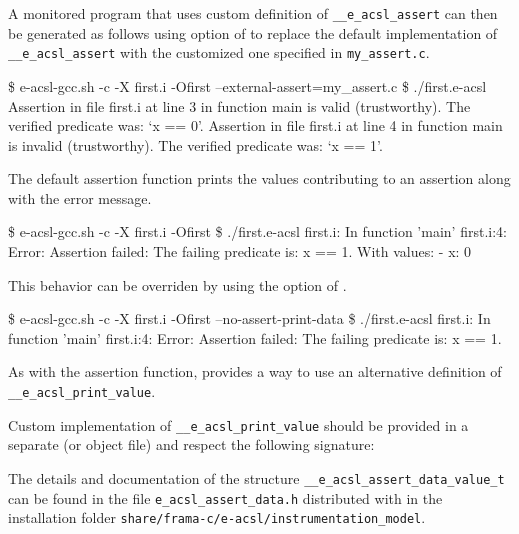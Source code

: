 
A monitored program that uses custom definition of
\texttt{\_\_e\_acsl\_assert} can then be generated
as follows using  option of \eacslgcc to replace the
default implementation of \texttt{\_\_e\_acsl\_assert}
with the customized one specified in \texttt{my\_assert.c}.

\begin{shell}
\$ e-acsl-gcc.sh -c -X first.i -Ofirst --external-assert=my_assert.c
\$ ./first.e-acsl
Assertion in file first.i at line 3 in function main is valid (trustworthy).
The verified predicate was: `x == 0'.
Assertion in file first.i at line 4 in function main is invalid (trustworthy).
The verified predicate was: `x == 1'.
\end{shell}

The default assertion function prints the values contributing to an assertion
along with the error message.

\begin{shell}
\$ e-acsl-gcc.sh -c -X first.i -Ofirst
\$ ./first.e-acsl
first.i: In function 'main'
first.i:4: Error: Assertion failed:
        The failing predicate is:
        x == 1.
        With values:
        - x: 0
\end{shell}

This behavior can be overriden by using the 
option of \eacslgcc.

\begin{shell}
  \$ e-acsl-gcc.sh -c -X first.i -Ofirst --no-assert-print-data
  \$ ./first.e-acsl
  first.i: In function 'main'
  first.i:4: Error: Assertion failed:
          The failing predicate is:
          x == 1.
\end{shell}

As with the assertion function, \eacslgcc provides a way to use an alternative
definition of
\texttt{\_\_e\_acsl\_print\_value}.

Custom implementation of \texttt{\_\_e\_acsl\_print\_value}
 should be provided in a separate \C
(or object file) and respect the following signature:


The details and documentation of the structure
\texttt{\_\_e\_acsl\_assert\_data\_value\_t} can be found in the file
\texttt{e\_acsl\_assert\_data.h} distributed with \eacsl in the installation
folder \texttt{share/frama-c/e-acsl/instrumentation\_model}.

